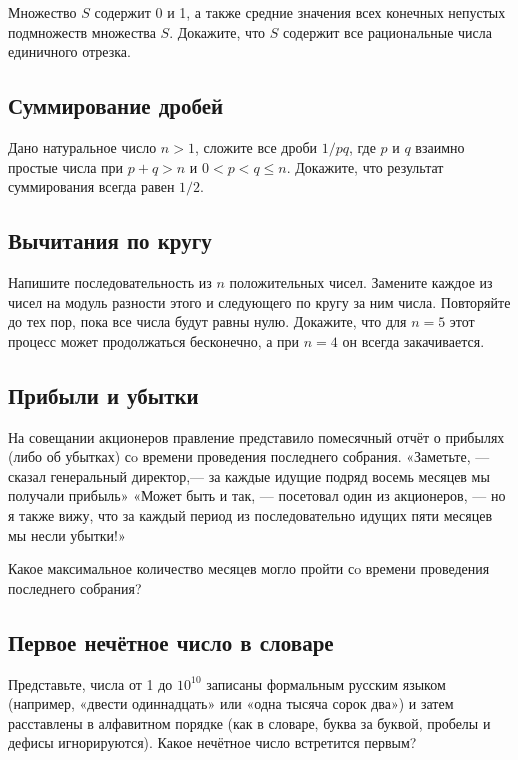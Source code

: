 Множество $S$ содержит 0 и 1, а также средние значения всех конечных непустых подмножеств множества $S$. 
Докажите, что $S$ содержит все рациональные числа единичного отрезка.



\subsection*{Суммирование дробей}%


Дано натуральное число $n>1$, 
сложите все дроби $1/pq$, где $p$ и $q$ взаимно простые числа при $p+q>n$ и $0<p<q\le n$. 
Докажите, что результат суммирования всегда равен $1/2$.



\subsection*{Вычитания по кругу}


Напишите последовательность из $n$ положительных чисел. 
Замените каждое из чисел на модуль разности %
этого и следующего по кругу за ним числа. 
Повторяйте до тех пор, пока все числа будут равны нулю. 
Докажите, что для $n=5$ этот процесс может продолжаться бесконечно, 
а при $n=4$ он всегда закачивается.



\subsection*{Прибыли и убытки}%


На совещании акционеров правление представило помесячный отчёт о прибылях (либо об убытках) сo времени проведения последнего собрания. «Заметьте, --- сказал генеральный директор,--- за каждые идущие подряд восемь месяцев мы получали прибыль»
«Может быть и так, --- посетовал один из акционеров, --- но я также вижу, что за каждый период из последовательно идущих пяти месяцев мы несли убытки!»

Какое максимальное количество месяцев могло пройти сo времени проведения последнего собрания?




\subsection*{Первое нечётное число в словаре}%


Представьте, числа от 1 до $10^{10}$ записаны формальным русским языком (например, «двести одиннадцать» или «одна тысяча сорок два») и затем расставлены в алфавитном порядке (как в словаре, буква за буквой, пробелы и дефисы игнорируются). 
Какое нечётное число встретится первым?
